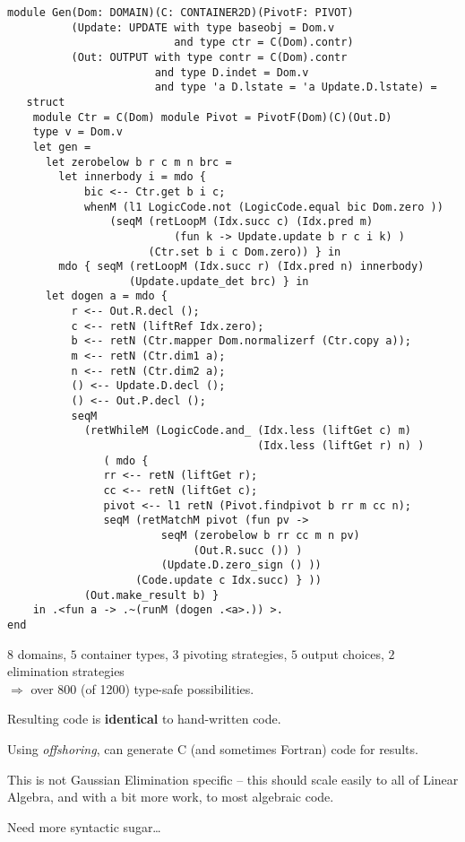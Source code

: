 \documentclass[landscape]{slides}
\begin{document}
\begin{slide}
    \begin{small}
\begin{verbatim}
module Gen(Dom: DOMAIN)(C: CONTAINER2D)(PivotF: PIVOT)
          (Update: UPDATE with type baseobj = Dom.v 
                          and type ctr = C(Dom).contr)
          (Out: OUTPUT with type contr = C(Dom).contr 
                       and type D.indet = Dom.v 
                       and type 'a D.lstate = 'a Update.D.lstate) =
   struct
    module Ctr = C(Dom) module Pivot = PivotF(Dom)(C)(Out.D)
    type v = Dom.v
    let gen =
      let zerobelow b r c m n brc =
        let innerbody i = mdo {
            bic <-- Ctr.get b i c;
            whenM (l1 LogicCode.not (LogicCode.equal bic Dom.zero ))
                (seqM (retLoopM (Idx.succ c) (Idx.pred m)
                          (fun k -> Update.update b r c i k) )
                      (Ctr.set b i c Dom.zero)) } in 
        mdo { seqM (retLoopM (Idx.succ r) (Idx.pred n) innerbody) 
                   (Update.update_det brc) } in
      let dogen a = mdo {
          r <-- Out.R.decl ();
          c <-- retN (liftRef Idx.zero);
          b <-- retN (Ctr.mapper Dom.normalizerf (Ctr.copy a));
          m <-- retN (Ctr.dim1 a);
          n <-- retN (Ctr.dim2 a);
          () <-- Update.D.decl ();
          () <-- Out.P.decl ();
          seqM 
            (retWhileM (LogicCode.and_ (Idx.less (liftGet c) m)
                                       (Idx.less (liftGet r) n) )
               ( mdo {
               rr <-- retN (liftGet r);
               cc <-- retN (liftGet c);
               pivot <-- l1 retN (Pivot.findpivot b rr m cc n);
               seqM (retMatchM pivot (fun pv -> 
                        seqM (zerobelow b rr cc m n pv)
                             (Out.R.succ ()) )
                        (Update.D.zero_sign () ))
                    (Code.update c Idx.succ) } ))
            (Out.make_result b) } 
    in .<fun a -> .~(runM (dogen .<a>.)) >.
end
\end{verbatim}
\end{small}
\end{slide}
\begin{slide}
$8$ domains, $5$ container types, $3$ pivoting strategies, 
$5$ output choices, $2$ elimination strategies\\
$\Longrightarrow$ over 800 (of 1200) type-safe possibilities.

Resulting code is \textbf{identical} to hand-written code.

Using \emph{offshoring}, can generate C (and sometimes Fortran) code
for results.
\end{slide}

\begin{slide}
    This is not Gaussian Elimination specific -- this should scale
    easily to all of Linear Algebra, and with a bit more work, to
    most algebraic code.

    Need more syntactic sugar\dots
\end{slide}
\end{document}
